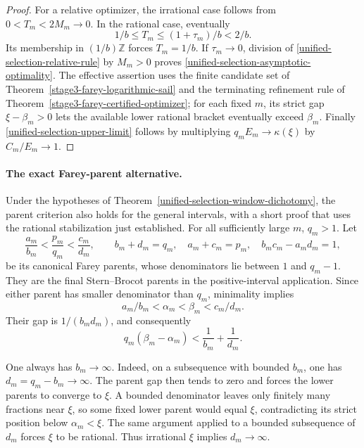 \documentclass[11pt,a4paper]{article}
\theoremstyle{definition}
\theoremstyle{remark}
\begin{document}
\begin{proof}
For a relative optimizer, the irrational case follows from
$0<T_m<2M_m\to0$. In the rational case, eventually
\[
 1/b\le T_m\le(1+\tau_m)/b<2/b.
\]
Its membership in $(1/b)\mathbb Z$ forces $T_m=1/b$.
If $\tau_m\to0$, division of
\eqref{unified-selection-relative-rule} by $M_m>0$ proves
\eqref{unified-selection-asymptotic-optimality}. The effective assertion
uses the finite candidate set of
Theorem~\ref{stage3-farey-logarithmic-sail} and the terminating refinement
rule of Theorem~\ref{stage3-farey-certified-optimizer}; for each fixed
$m$, its strict gap $\xi-\beta_m>0$ lets the available lower rational
bracket eventually exceed $\beta_m$.
Finally \eqref{unified-selection-upper-limit} follows by multiplying
$q_mE_m\to\kappa(\xi)$ by $C_m/E_m\to1$.
\end{proof}

\paragraph{The exact Farey-parent alternative.}
Under the hypotheses of
Theorem~\ref{unified-selection-window-dichotomy}, the parent criterion
also holds for the general intervals, with a short proof that uses the
rational stabilization just established. For all sufficiently large $m$,
$q_m>1$. Let
\[
 \frac{a_m}{b_m}<\frac{p_m}{q_m}<\frac{c_m}{d_m},
 \qquad b_m+d_m=q_m,\quad a_m+c_m=p_m,\quad
 b_mc_m-a_md_m=1,
\]
be its canonical Farey parents, whose denominators lie between $1$ and
$q_m-1$. They are the final Stern--Brocot parents in the positive-interval
application. Since either parent has smaller denominator than $q_m$,
minimality implies
\[
 a_m/b_m<\alpha_m<\beta_m<c_m/d_m.
\]
Their gap is $1/(b_md_m)$, and consequently
\begin{equation}\label{unified-selection-parent-gap}
 q_m(\beta_m-\alpha_m)<\frac1{b_m}+\frac1{d_m}.
\end{equation}

One always has $b_m\to\infty$. Indeed, on a subsequence with bounded
$b_m$, one has $d_m=q_m-b_m\to\infty$. The parent gap then tends to
zero and forces the lower parents to converge to $\xi$. A bounded
denominator leaves only finitely many fractions near $\xi$, so some
fixed lower parent would equal $\xi$, contradicting its strict position
below $\alpha_m<\xi$.
The same argument applied to a bounded subsequence of $d_m$ forces
$\xi$ to be rational. Thus irrational $\xi$ implies $d_m\to\infty$.
\end{document}

